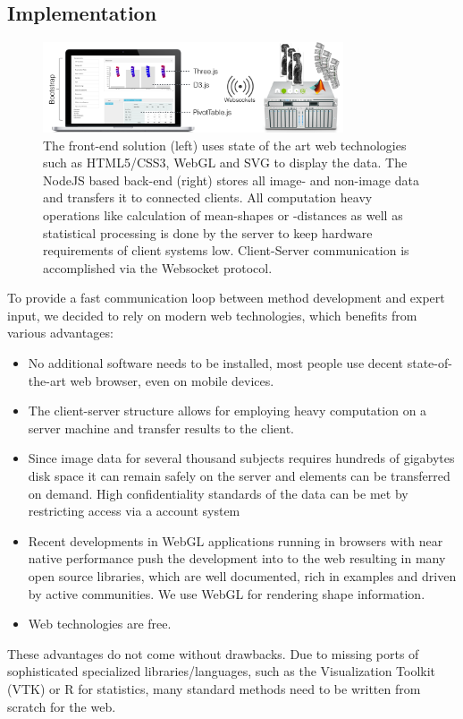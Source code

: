 \documentclass[journal]{style/vgtc} 			          %
\begin{document}
\subsection{Implementation}
\begin{figure}[htb]
 \centering
 \label{fig:technologies}
 \includegraphics[width=3.5in]{figures/technologies}
 \caption{The front-end solution (left) uses state of the art web technologies such as HTML5/CSS3, WebGL and SVG to display the data.
 The NodeJS based back-end (right) stores all image- and non-image data and transfers it to connected clients.
 All computation heavy operations like calculation of mean-shapes or -distances as well as statistical processing is done by the server to keep hardware requirements of client systems low. 
 Client-Server communication is accomplished via the Websocket protocol.
 }
\end{figure}
%
To provide a fast communication loop between method development and expert input, we decided to rely on modern web technologies, which benefits from various advantages:
\begin{itemize}
	\item No additional software needs to be installed, most people use decent state-of-the-art web browser, even on mobile devices.
	\item The client-server structure allows for employing heavy computation on a server machine and transfer results to the client.
	\item Since image data for several thousand subjects requires hundreds of gigabytes disk space it can remain safely on the server and elements can be transferred on demand.
	High confidentiality standards of the data can be met by restricting access via a account system
	\item Recent developments in WebGL applications running in browsers with near native performance push the development into to the web resulting in many open source libraries, which are well documented, rich in examples and driven by active communities. We use WebGL for rendering shape information.
	\item Web technologies are free.
\end{itemize}
These advantages do not come without drawbacks.
%
Due to missing ports of sophisticated specialized libraries/languages, such as the Visualization Toolkit (VTK) or R for statistics, many standard methods need to be written from scratch for the web.
%
\end{document}
